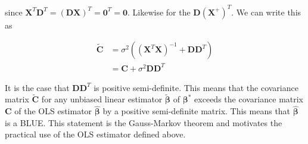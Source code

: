 \documentclass[12pt]{article}
\newcommand{\bv}[1]{\boldsymbol{#1}}
\begin{document}
since $\bv{X}^T \bv{D}^T = (\bv{D}\bv{X})^T = \bv{0}^T = \bv{0}$. Likewise for the $\bv{D}(\bv{X}^+)^T$. We can write this as

\begin{align}
\bv{\tilde{C}} &= \sigma^2\left((\bv{X}^T\bv{X})^{-1} + \bv{D}\bv{D}^T\right)\\
&=\bv{C} + \sigma^2 \bv{D}\bv{D}^T
\end{align}

It is the case that $\bv{D}\bv{D}^T$ is positive semi-definite. 
This means that the covariance matrix $\bv{\tilde{C}}$ for any unbiased linear estimator $\bv{\tilde{\beta}}$ of $\bv{\beta^*}$ exceeds the covariance matrix $\bv{C}$ of the OLS estimator $\bv{\hat{\beta}}$ by a positive semi-definite matrix. 
This means that $\bv{\hat{\beta}}$ is a BLUE. 
This statement is the Gauss-Markov theorem and motivates the practical use of the OLS estimator defined above.
\end{document}
